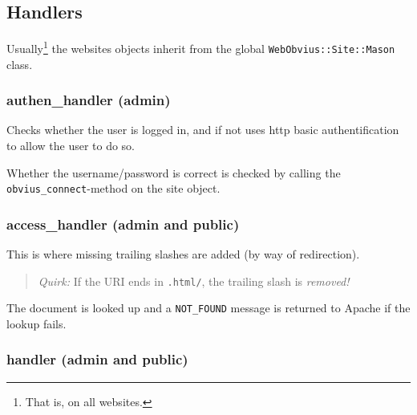 \documentclass[a4paper,12pt]{article}
\newcommand{\obvius}{\textsc{Obvius}}
\newcommand{\notfound}{\texttt{NOT\_FOUND}}
\newenvironment{quirk}{\begin{quote}\emph{Quirk:}}{\end{quote}}
\begin{document}
\subsection{Handlers}

Usually\footnote{That is, on all websites.} the websites objects
inherit from the global \texttt{WebObvius::Site::Mason} class.

\subsubsection{authen\_handler (admin)}

Checks whether the user is logged in, and if not uses http basic
authentification to allow the user to do so.

Whether the username/password is correct is checked by calling the
\texttt{obvius\_connect}-method on the site object.


\subsubsection{access\_handler (admin and public)}

This is where missing trailing slashes are added (by way of
redirection).

\begin{quirk}
  If the URI ends in \texttt{.html/}, the trailing slash is \emph{removed!}
\end{quirk}


The document is looked up
and a {\notfound} message is returned to Apache if the
lookup fails.


\subsubsection{handler (admin and public)}
\end{document}
